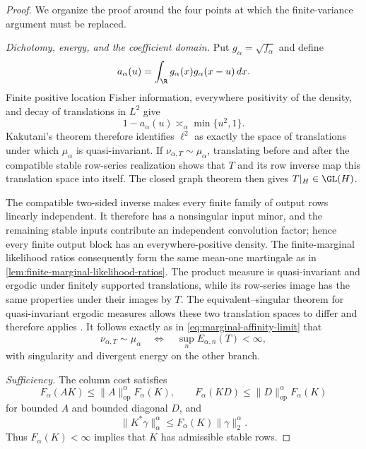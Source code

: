 \begin{proof}
We organize the proof around the four points at which the finite-variance
argument must be replaced.

\emph{Dichotomy, energy, and the coefficient domain.}
Put \(g_\alpha=\sqrt{f_\alpha}\) and define
\[
 a_\alpha(u)=\int_\R g_\alpha(x)g_\alpha(x-u)\,dx.
\]
Finite positive location Fisher information, everywhere positivity of the
density, and decay of translations in \(L^2\) give
\begin{equation}
 1-a_\alpha(u)\asymp_\alpha\min\{u^2,1\}.
 \label{eq:stable-translation-affinity}
\end{equation}
Kakutani's theorem therefore identifies \(\ell^2\) as exactly the space of
translations under which \(\mu_\alpha\) is quasi-invariant.
If \(\nu_{\alpha,T}\sim\mu_\alpha\), translating before and after the
compatible stable row-series realization shows that \(T\) and its row inverse map this
translation space into itself.
The closed graph theorem then gives \(T|_H\in\GL(H)\).

The compatible two-sided inverse makes every finite family of output rows
linearly independent.
It therefore has a nonsingular input minor, and the remaining stable inputs
contribute an independent convolution factor; hence every finite output
block has an everywhere-positive density.
The finite-marginal likelihood ratios consequently form the same mean-one
martingale as in
\cref{lem:finite-marginal-likelihood-ratios}.
The product measure is quasi-invariant and ergodic under finitely supported
translations, while its row-series image has the same properties under their
images by \(T\).
The equivalent--singular theorem for quasi-invariant ergodic measures allows
these two translation spaces to differ and therefore applies
\cite{okazaki1985dichotomy}.
It follows exactly as in \eqref{eq:marginal-affinity-limit} that
\begin{equation}
 \nu_{\alpha,T}\sim\mu_\alpha
 \quad\Longleftrightarrow\quad
 \sup_nE_{\alpha,n}(T)<\infty,
 \label{eq:stable-energy-dichotomy}
\end{equation}
with singularity and divergent energy on the other branch.

\emph{Sufficiency.}
The column cost satisfies
\begin{equation}
 F_\alpha(AK)\le\|A\|_{\mathrm{op}}^\alpha F_\alpha(K),
 \qquad
 F_\alpha(KD)\le\|D\|_{\mathrm{op}}^\alpha F_\alpha(K)
 \label{eq:stable-column-class-bounds}
\end{equation}
for bounded \(A\) and bounded diagonal \(D\), and
\begin{equation}
 \|K^*\gamma\|_\alpha^\alpha
 \le F_\alpha(K)\|\gamma\|_2^\alpha.
 \label{eq:stable-row-admissibility-bound}
\end{equation}
Thus \(F_\alpha(K)<\infty\) implies that \(K\) has admissible stable rows.


\end{proof}
